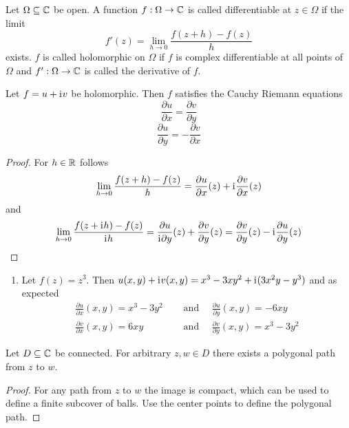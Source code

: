 \begin{definition}\label{def:holomorphic_fnc}
Let \( \Omega \subseteq \mathbb{C} \) be open. A function \( f : \Omega \to \mathbb{C} \) is called differentiable at 
\( z \in \Omega \) if the limit 
\[
	f'(z) = \lim_{h \to 0} \frac{f(z + h) - f(z)}{h}
\]
exists. \( f \) is called holomorphic on \( \Omega \) if \( f \) is complex differentiable 
at all points of \( \Omega \) and \( f': \Omega \to \mathbb{C} \) is called the derivative of \( f \).
\bigskip


\begin{theorem}\label{thm:thm_cauchy_riemann_eqations}
Let \( f = u + \mathrm{i}\mkern1mu v \) be holomorphic. Then \( f \) satisfies the Cauchy Riemann equations
\[
		\frac{\partial u}{\partial x} = \frac{\partial v}{\partial y}
\]
\[
		\frac{\partial u}{\partial y} = - \frac{\partial v}{\partial x}
\]
\end{theorem}

\begin{proof}
For \( h \in \mathbb{R} \) follows
\[
	\lim_{h \to 0}\frac{f(z + h) - f(z)}{h} = \frac{\partial u}{\partial x}(z) + \mathrm{i}\mkern1mu \frac{\partial v}{\partial x}(z)
\]	
and
\[
	\lim_{h \to 0}\frac{f(z + \mathrm{i}\mkern1mu h) - f(z)}{\mathrm{i}\mkern1mu h}
		= \frac{\partial u}{\mathrm{i}\mkern1mu\partial y}(z) + \frac{\partial v}{\partial y}(z)
		= \frac{\partial v}{\partial y}(z) - \mathrm{i}\mkern1mu\frac{\partial u}{\partial y}(z)
\]	

\end{proof}
\bigskip


\begin{examples}\hfill
    \begin{enumerate}
        \item Let \( f(z) = z^3 \). Then \( u(x,y) + \mathrm{i}\mkern1mu v(x,y) = x^3 - 3xy^2 + \mathrm{i}\mkern1mu (3x^2y -y^3) \) and as expected
			\[
				\begin{split}
					\frac{\partial u}{\partial x}(x,y) = x^3 - 3y^2 & \quad\text{ and }\quad 
						\frac{\partial u}{\partial y}(x,y) = -6xy \\
					\frac{\partial v}{\partial x}(x,y) = 6xy & \quad\text{ and }\quad
						\frac{\partial v}{\partial y}(x,y) = x^3 - 3y^2
				\end{split}
			\]
    \end{enumerate}
\end{examples}
\bigskip


\begin{lemma}
Let \( D \subseteq \mathbb{C} \) be connected. For arbitrary \( z, w \in D \) there exists a polygonal path from
\( z \) to \( w \).
\end{lemma}
\begin{proof} 
For any path from \( z \) to \( w \) the image is compact, which can be used to define a finite subcover of balls. 
Use the center points to define the polygonal path.
\end{proof}
\bigskip



\end{definition}
